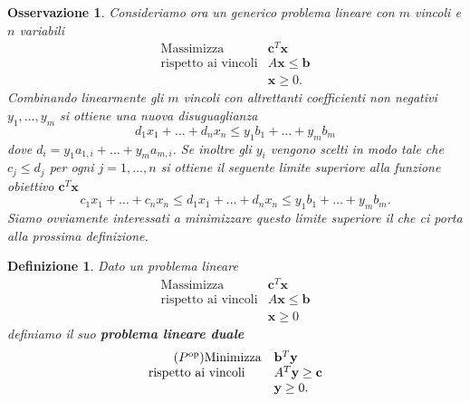\documentclass[italian, 12pt, reqno]{article}
\theoremstyle{myteo}
\newtheorem{definition}[theorem]{Definizione}
\newtheorem{remark}[theorem]{Osservazione}
\numberwithin{equation}{section}
\newcommand{\dual}[1]{#1^{\text{op}}}
\begin{document}
\begin{remark}
  \label{oss:bound}
  Consideriamo ora un generico problema lineare con \(m\) vincoli e \(n\) variabili
  \begin{equation*}
    \begin{array}{ll}
      \text{Massimizza} & \mathbf{c}^T\mathbf{x}\\
      \text{rispetto ai vincoli} & A\mathbf{x}\leq\mathbf{b}\\
                        & \mathbf{x}\geq0.
    \end{array}
  \end{equation*}
  Combinando linearmente gli \(m\) vincoli con altrettanti coefficienti \emph{non negativi} \(y_1,\ldots,y_m\) si ottiene una nuova disuguaglianza
  \[d_1x_1+\ldots+d_nx_n\leq y_1b_1+\ldots+y_mb_m\]
  dove \(d_i = y_1a_{1,i}+\ldots+y_ma_{m,i}\). Se inoltre gli \(y_i\) vengono scelti in modo tale che \(c_j\leq d_j\) per ogni \(j=1,\ldots, n\) si ottiene il seguente limite superiore alla funzione obiettivo \(\mathbf{c}^T\mathbf{x}\)
  \[c_1x_1+\ldots+c_nx_n\leq d_1x_1+\ldots+d_nx_n\leq y_1b_1+\ldots+y_mb_m.\]
  Siamo ovviamente interessati a \emph{minimizzare} questo limite superiore il che ci porta alla prossima definizione.
\end{remark}

\begin{definition}
  \label{def:problema_duale}
  Dato un problema lineare
  \begin{equation*}
    \begin{array}{ll}
      \tag{\(P\)}
      \text{Massimizza} & \mathbf{c}^T\mathbf{x}\\
      \text{rispetto ai vincoli} & A\mathbf{x}\leq\mathbf{b}\\
                        & \mathbf{x}\geq0
    \end{array}
  \end{equation*}
  definiamo il suo \textbf{problema lineare duale}
  \begin{equation*}
    \begin{array}{ll}
      \tag{\(\dual{P}\)}
      \text{Minimizza} & \mathbf{b}^T\mathbf{y}\\
      \text{rispetto ai vincoli} & A^T\mathbf{y}\geq\mathbf{c}\\
                        & \mathbf{y}\geq0.
    \end{array}
  \end{equation*}
\end{definition}
\end{document}
